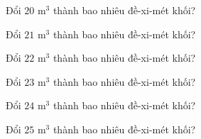 \begin{ex}
  Đổi $20\text{ m}^3$ thành bao nhiêu đề-xi-mét khối?
\end{ex}

\begin{ex}
  Đổi $21\text{ m}^3$ thành bao nhiêu đề-xi-mét khối?
\end{ex}

\begin{ex}
  Đổi $22\text{ m}^3$ thành bao nhiêu đề-xi-mét khối?
\end{ex}

\begin{ex}
  Đổi $23\text{ m}^3$ thành bao nhiêu đề-xi-mét khối?
\end{ex}

\begin{ex}
  Đổi $24\text{ m}^3$ thành bao nhiêu đề-xi-mét khối?
\end{ex}

\begin{ex}
  Đổi $25\text{ m}^3$ thành bao nhiêu đề-xi-mét khối?
\end{ex}
